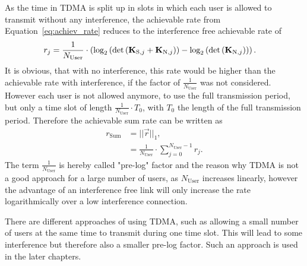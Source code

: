 As the time in TDMA is split up in slots in which each user is allowed to transmit without any interference, the achievable rate from Equation~\eqref{eq:achiev_rate} reduces to the interference free achievable rate of 
\begin{align}
\label{eq:tdma_achiev_rate}
r_j  &=\frac{1}{N_\text{User}}\cdot\left(
		\text{log}_2\left(\text{det}\left(\mathbf{K}_{\text{S},j}+\mathbf{K}_{\text{N},j}\right)\right) -
	     	\text{log}_2\left(\text{det}\left(\mathbf{K}_{\text{N},j}\right)\right)\right).
\end{align}
It is obvious, that with no interference, this rate would be higher than the achievable rate with interference, if the factor of $\frac{1}{N_\text{User}}$ was not considered.
However each user is not allowed anymore, to use the full transmission period, but only a time slot of length $\frac{1}{N_\text{User}}\cdot T_0$, with $T_0$ the length of the full transmission period.
Therefore the achievable sum rate can be written as
\begin{align}
\label{eq:tdma_achiev_sum_rate}
\nonumber
r_\text{Sum} &= ||\vec{r}||_1,\\
&= \frac{1}{N_\text{User}}\cdot \sum_{j=0}^{N_\text{User}-1} r_j.
\end{align}
The term $\frac{1}{N_\text{User}}$ is hereby called "pre-log" factor and the reason why TDMA is not a good approach for a large number of users, as $N_\text{User}$ increases linearly, however the advantage of an interference free link will only increase the rate logarithmically over a low interference connection.

There are different approaches of using TDMA, such as allowing a small number of users at the same time to transmit during one time slot.
This will lead to some interference but therefore also a smaller pre-log factor.
Such an approach is used in the later chapters.






